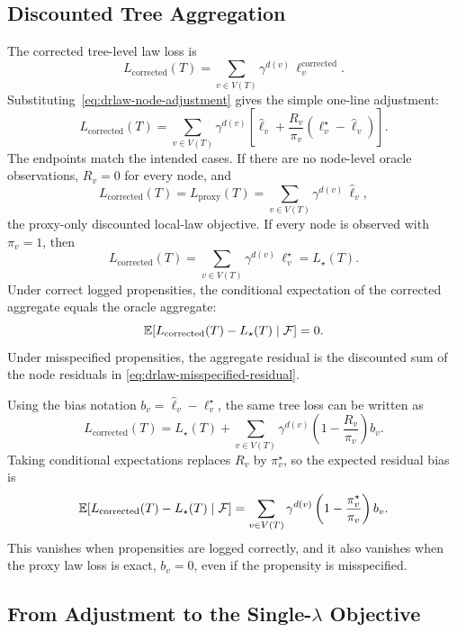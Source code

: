 \subsection{Discounted Tree Aggregation}
\label{app:drlaw-tree-aggregation}

The corrected tree-level law loss is
\begin{equation}
\label{eq:drlaw-adjusted-tree-loss}
  L_{\mathrm{corrected}}(T)
  =
  \sum_{v\in V(T)}
  \gamma^{d(v)}\,\ell_v^{\mathrm{corrected}} .
\end{equation}
Substituting~\eqref{eq:drlaw-node-adjustment} gives the simple
one-line adjustment:
\[
  L_{\mathrm{corrected}}(T)
  =
  \sum_{v\in V(T)}
  \gamma^{d(v)}
  \left[
    \widehat\ell_v
    +
    \frac{R_v}{\pi_v}
    \left(\ell_v^\star-\widehat\ell_v\right)
  \right].
\]
The endpoints match the intended cases. If there are no node-level
oracle observations, \(R_v=0\) for every node, and
\[
  L_{\mathrm{corrected}}(T)
  =
  L_{\mathrm{proxy}}(T)
  =
  \sum_{v\in V(T)}
  \gamma^{d(v)}\,\widehat\ell_v ,
\]
the proxy-only discounted local-law objective. If every node is
observed with \(\pi_v=1\), then
\[
  L_{\mathrm{corrected}}(T)
  =
  \sum_{v\in V(T)}
  \gamma^{d(v)}\,\ell_v^\star
  =
  L_\star(T).
\]
Under correct logged propensities, the conditional expectation of
the corrected aggregate equals the oracle aggregate:
\[
  \mathbb{E}\!\left[
    L_{\mathrm{corrected}}(T)
    -
    L_\star(T)
    \mid \mathcal F
  \right]
  =
  0.
\]
Under misspecified propensities, the aggregate residual is the
discounted sum of the node residuals in
\eqref{eq:drlaw-misspecified-residual}.

Using the bias notation \(b_v=\widehat\ell_v-\ell_v^\star\), the same
tree loss can be written as
\begin{equation}
\label{eq:drlaw-tree-bias-form}
  L_{\mathrm{corrected}}(T)
  =
  L_\star(T)
  +
  \sum_{v\in V(T)}
  \gamma^{d(v)}
  \left(1-\frac{R_v}{\pi_v}\right)b_v .
\end{equation}
Taking conditional expectations replaces \(R_v\) by
\(\pi_v^\star\), so the expected residual bias is
\[
  \mathbb{E}\!\left[
    L_{\mathrm{corrected}}(T)-L_\star(T)
    \mid\mathcal F
  \right]
  =
  \sum_{v\in V(T)}
  \gamma^{d(v)}
  \left(1-\frac{\pi_v^\star}{\pi_v}\right)b_v .
\]
This vanishes when propensities are logged correctly, and it also
vanishes when the proxy law loss is exact, \(b_v=0\), even if the
propensity is misspecified.

\subsection{From Adjustment to the Single-\texorpdfstring{\(\lambda\)}{lambda} Objective}
\label{app:drlaw-single-lambda}

